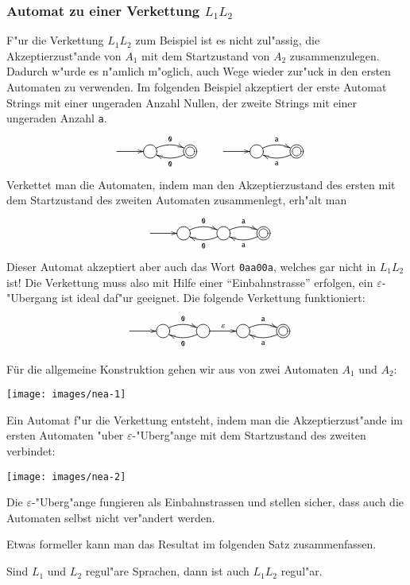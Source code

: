 \subsubsection{Automat zu einer Verkettung $L_1L_2$}
F"ur die Verkettung $L_1L_2$
zum Beispiel ist es nicht zul"assig, die Akzeptierzust"ande von
$A_1$ mit dem Startzustand von $A_2$ zusammenzulegen. Dadurch
w"urde es n"amlich m"oglich, auch Wege wieder zur"uck in
den ersten Automaten zu verwenden.
Im folgenden Beispiel akzeptiert der erste Automat Strings mit
einer ungeraden Anzahl Nullen, der zweite Strings mit einer
ungeraden Anzahl {\tt a}.
\[
\entrymodifiers={++[o][F]}
\xymatrix{
*+\txt{}\ar[r]
	&{} \ar@/^/[r]^{\tt 0}
		&*++[o][F=]{} \ar@/^/[l]^{\tt 0}
			&*\txt{}\ar[r]
				&{} \ar@/^/[r]^{\tt a}
					&*++[o][F=]{} \ar@/^/[l]^{\tt a }
}
\]
Verkettet man die Automaten, indem man den Akzeptierzustand des
ersten mit dem Startzustand des zweiten Automaten zusammenlegt,
erh"alt man
\[
\entrymodifiers={++[o][F]}
\xymatrix{
*+\txt{}\ar[r]
	&{} \ar@/^/[r]^{\tt 0}
		&{} \ar@/^/[l]^{\tt 0}
				 \ar@/^/[r]^{\tt a}
					&*++[o][F=]{} \ar@/^/[l]^{\tt a }
}
\]
Dieser Automat akzeptiert aber auch das Wort {\tt 0aa00a}, welches
gar nicht in $L_1L_2$ ist! Die Verkettung muss also mit Hilfe
einer ``Einbahnstrasse'' erfolgen, ein $\varepsilon$-"Ubergang
ist ideal daf"ur geeignet. Die folgende Verkettung funktioniert:
\[
\entrymodifiers={++[o][F]}
\xymatrix{
*+\txt{}\ar[r]
	&{} \ar@/^/[r]^{\tt 0}
		&{} \ar@/^/[l]^{\tt 0} \ar[r]^{\varepsilon}
			&{} \ar@/^/[r]^{\tt a}
				&*++[o][F=]{} \ar@/^/[l]^{\tt a }
}
\]

F\"ur die allgemeine Konstruktion gehen wir aus
von zwei Automaten $A_1$ und $A_2$:
\begin{center}
\texttt{[image: images/nea-1]}
\end{center}
Ein Automat f"ur die Verkettung entsteht, indem man
die Akzeptierzust"ande im ersten Automaten "uber
$\varepsilon$-"Uberg"ange mit dem
Startzustand des zweiten verbindet:
\begin{center}
\texttt{[image: images/nea-2]}
\end{center}
Die $\varepsilon$-"Uberg"ange
fungieren als Einbahnstrassen und stellen sicher, dass auch
die Automaten selbst nicht ver"andert werden.

Etwas formeller kann man das Resultat im folgenden Satz zusammenfassen.

\begin{satz}
\label{satz_concat}
Sind $L_1$ und $L_2$ regul"are Sprachen, dann ist auch $L_1L_2$
regul"ar.
\end{satz}

